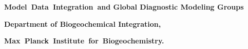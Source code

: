 \begin{titlepage}
\begin{center}
	{\bfseries Model\ Data\ Integration\ and Global Diagnostic Modeling Groups}

{\bfseries Department of Biogeochemical Integration,}
	
	{\titlefont\large\bfseries
    Max\ Planck\ Institute\ for\ Biogeochemistry.}



\vskip-10cm

\end{center}

\end{titlepage}

